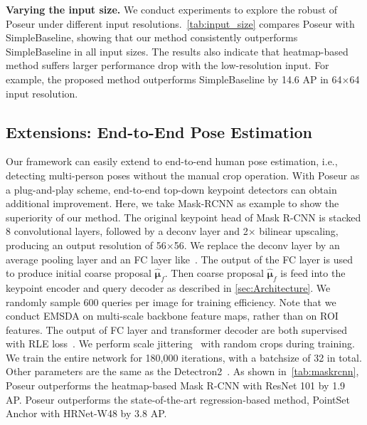 \documentclass[runningheads]{llncs}
\def\ie{{i.e.\xspace}}
\def\handle{{Poseur}\xspace}
\def\Loc{{\boldsymbol{\mu}}}
\def\KPF{{\hat{\mathbf{\Loc}}_f}}
\begin{document}
\noindent\textbf{Varying the input size.} We conduct experiments to explore the robust of \handle under different input resolutions.~\cref{tab:input_size} compares \handle with SimpleBaseline, showing that our method consistently outperforms SimpleBaseline in all input sizes.
The results also indicate that heatmap-based method suffers larger performance drop with the low-resolution input. For example, the proposed method outperforms SimpleBaseline by 14.6 AP in 64$\times$64 input resolution. 









\subsection{Extensions: End-to-End Pose Estimation}
Our framework can easily extend to end-to-end human pose estimation, \ie, detecting multi-person poses without the manual crop operation. With \handle as a plug-and-play scheme, end-to-end top-down keypoint detectors can obtain additional improvement. Here, we take Mask-RCNN as example to show the superiority of our method. The original keypoint head of Mask R-CNN is stacked 8 convolutional layers, followed by a deconv layer and 2× bilinear upscaling, producing an output resolution of 56$\times$56. We replace the deconv layer by an average pooling layer and an FC layer like~\cite{li2021rle}. The output of the FC layer is used to produce initial coarse proposal $\KPF$. Then coarse proposal $\KPF$ is feed into the keypoint encoder and query decoder as described in \cref{sec:Architecture}. We randomly sample 600 queries per image for training efficiency. Note that we conduct EMSDA on multi-scale backbone feature maps, rather than on ROI features. The output of FC layer and transformer decoder are both supervised with RLE loss~\cite{li2021rle}.
We perform scale jittering~\cite{ghiasi2021simple} with random crops during training.
We train the entire network for 180,000 iterations, with a batchsize of 32 in total. Other parameters are the same as the Detectron2~\cite{wu2019detectron2}.
As shown in~\cref{tab:maskrcnn}, \handle outperforms the heatmap-based Mask R-CNN with ResNet 101 by 1.9 AP. \handle outperforms the state-of-the-art regression-based method, PointSet Anchor with HRNet-W48 by $3.8$ AP.
\end{document}

